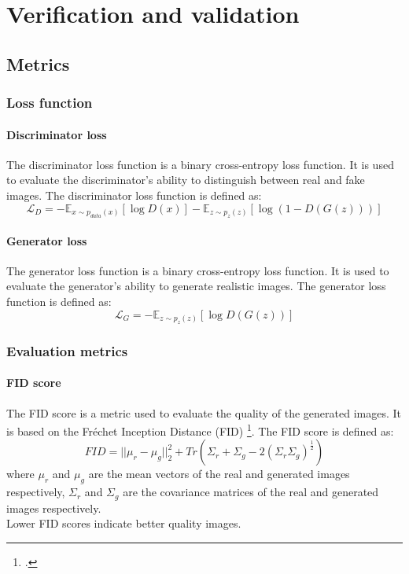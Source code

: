 \chapter{Verification and validation}
\label{cap:verification-validation}
\section{Metrics}
\label{sec:metrics}
\subsection{Loss function}
\subsubsection{Discriminator loss}
The discriminator loss function is a binary cross-entropy loss function.
It is used to evaluate the discriminator's ability to distinguish between real and fake images.
The discriminator loss function is defined as:
\begin{equation}
    \label{eq:discriminator-loss}
    \mathcal{L}_{D} = -\mathbb{E}_{x \sim p_{data}(x)}[\log D(x)] - \mathbb{E}_{z \sim p_{z}(z)}[\log (1 - D(G(z)))]
\end{equation}
\subsubsection{Generator loss}
The generator loss function is a binary cross-entropy loss function.
It is used to evaluate the generator's ability to generate realistic images.
The generator loss function is defined as:
\begin{equation}
    \label{eq:generator-loss}
    \mathcal{L}_{G} = -\mathbb{E}_{z \sim p_{z}(z)}[\log D(G(z))]
\end{equation}


\subsection{Evaluation metrics}
\subsubsection{FID score}
The FID score is a metric used to evaluate the quality of the generated images.
It is based on the Fréchet Inception Distance (FID) \footcite{paper:heusel2017gans}.
The FID score is defined as:
\begin{equation}
    \label{eq:fid-score}
    FID = ||\mu_{r} - \mu_{g}||^{2}_{2} + Tr(\Sigma_{r} + \Sigma_{g} - 2(\Sigma_{r}\Sigma_{g})^{\frac{1}{2}})
\end{equation}
where $\mu_{r}$ and $\mu_{g}$ are the mean vectors of the real and generated images respectively, $\Sigma_{r}$ and $\Sigma_{g}$ are the covariance matrices of the real and generated images respectively.\\
Lower FID scores indicate better quality images.
